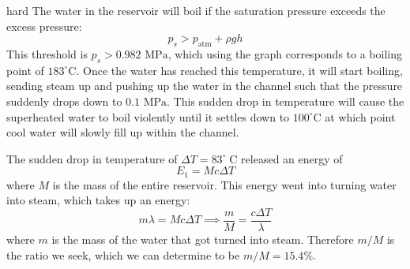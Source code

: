 \begin{solution}{hard}
The water in the reservoir will boil if the saturation pressure exceeds the excess pressure:
$$p_s > p_\text{atm} + \rho gh$$
This threshold is $p_s > 0.982 \text{ MPa}$, which using the graph corresponds to a boiling point of $183^\circ \text{C}$. Once the water has reached this temperature, it will start boiling, sending steam up and pushing up the water in the channel such that the pressure suddenly drops down to $0.1 \text{ MPa}$.  This sudden drop in temperature will cause the superheated water to boil violently until it settles down to $100^\circ \text{C}$ at which point cool water will slowly fill up within the channel.
\vspace{3mm}

\noindent The sudden drop in temperature of $\Delta T = 83^{\circ}\;\mathrm{C}$ released an energy of
$$E_1 = Mc\Delta T$$
where $M$ is the mass of the entire reservoir. This energy went into turning water into steam, which takes up an energy:
$$m\lambda = Mc\Delta T \implies \frac{m}{M} = \frac{c\Delta T}{\lambda}$$
where $m$ is the mass of the water that got turned into steam. Therefore $m/M$ is the ratio we seek, which we can determine to be $m/M = \boxed{15.4\%}$.
\end{solution}